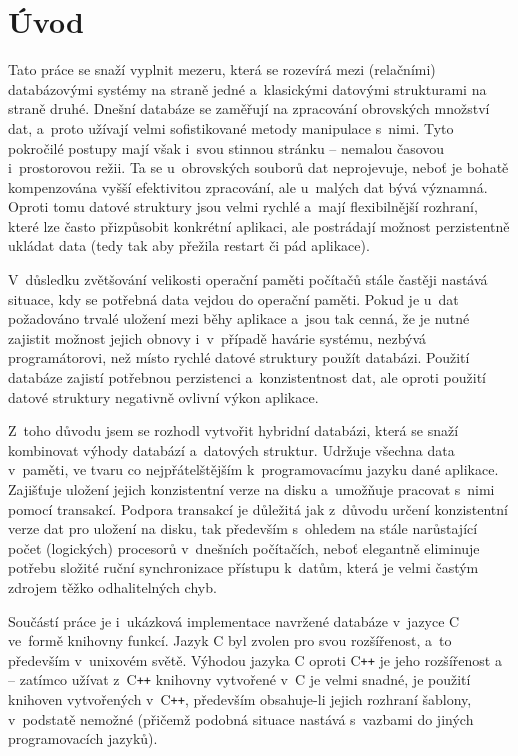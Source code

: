 \chapter*{Úvod}

Tato práce se snaží vyplnit mezeru, která se rozevírá mezi (relačními) databázovými systémy
na straně jedné a~klasickými datovými strukturami na straně druhé. Dnešní
 databáze se zaměřují na zpracování obrovských množství dat, a~proto
užívají velmi sofistikované metody manipulace s~nimi. Tyto
pokročilé postupy mají však i~svou stinnou stránku -- nemalou časovou i~prostorovou
režii. Ta se u~obrovských souborů dat neprojevuje,
neboť je bohatě kompenzována vyšší efektivitou zpracování,
ale u~malých dat bývá významná.
Oproti tomu datové struktury jsou velmi rychlé a~mají flexibilnější rozhraní,
které lze často přizpůsobit konkrétní aplikaci, ale postrádají možnost perzistentně
ukládat data (tedy tak aby přežila restart či pád aplikace).

V~důsledku zvětšování velikosti operační paměti počítačů
stále častěji nastává situace, kdy se potřebná data vejdou do operační paměti.
Pokud je u~dat požadováno trvalé uložení mezi běhy aplikace a~jsou tak cenná,
že je nutné zajistit možnost jejich obnovy i~v~případě havárie systému,
nezbývá programátorovi, než místo rychlé datové struktury použít databázi.
Použití databáze zajistí potřebnou perzistenci a~konzistentnost dat, ale
oproti použití datové struktury negativně ovlivní výkon aplikace.

Z~toho důvodu jsem se rozhodl vytvořit hybridní databázi, která se snaží kombinovat
výhody databází a~datových struktur. Udržuje všechna data v~paměti, 
ve tvaru co nejpřátelštějším k~programovacímu
jazyku dané aplikace. Zajišťuje uložení jejich konzistentní verze na disku
a~umožňuje pracovat s~nimi pomocí transakcí. Podpora transakcí je důležitá
jak z~důvodu určení konzistentní verze dat pro uložení na disku, tak především
s~ohledem na stále narůstající počet (logických) procesorů v~dnešních
počítačích, neboť elegantně eliminuje potřebu složité ruční synchronizace přístupu
k~datům,
která je velmi častým zdrojem těžko odhalitelných chyb.

Součástí práce je i~ukázková implementace navržené databáze v~jazyce C ve~formě
knihovny funkcí. Jazyk C byl zvolen pro svou rozšířenost, a~to především v~unixovém
světě. Výhodou jazyka C oproti C{\tt++} je jeho rozšířenost a~ -- zatímco
užívat z~C{\tt++} knihovny vytvořené v~C je velmi snadné, je použití knihoven
vytvořených v~C{\tt++}, především obsahuje-li jejich rozhraní šablony, v~podstatě nemožné
(přičemž podobná situace nastává s~vazbami do jiných programovacích jazyků).

